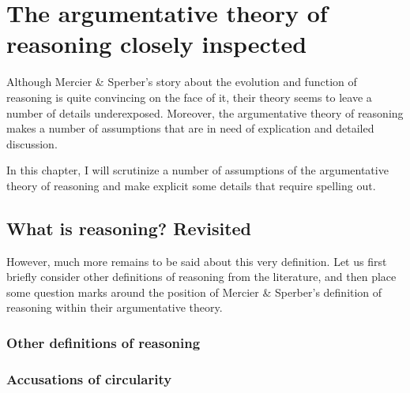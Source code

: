 \chapter{The argumentative theory of reasoning closely inspected}
\label{ch:scrutiny}

Although Mercier \& Sperber's story about the evolution and function of reasoning is quite convincing on the face of it, their theory seems to leave a number of details underexposed. Moreover, the argumentative theory of reasoning makes a number of assumptions that are in need of explication and detailed discussion.

In this chapter, I will scrutinize a number of assumptions of the argumentative theory of reasoning and make explicit some details that require spelling out.


\section{What is reasoning? Revisited}
\label{sec:def-scrutiny}

However, much more remains to be said about this very definition. Let us first briefly consider other definitions of reasoning from the literature, and then place some question marks around the position of Mercier \& Sperber's definition of reasoning within their argumentative theory.

\subsection{Other definitions of reasoning}


\subsection{Accusations of circularity}


